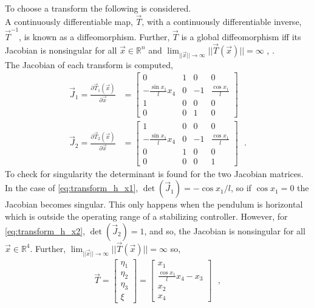 %
To choose a transform the following is considered.\\
A continuously differentiable map, $\vec{T}$, with a continuously differentiable inverse, $\vec{T}^{-1}$, is known as a diffeomorphism. Further, $\vec{T}$ is a global diffeomorphism iff its Jacobian is nonsingular for all $\vec{x} \in \mathbb{R}^n$ and $\lim_{||\vec{x}||\rightarrow \infty}||\vec{T}(\vec{x})|| = \infty$ , \cite{HKKhalil}.\\
The Jacobian of each transform is computed,
\begin{align}
\vec{J}_1 = \frac{\partial \vec{T}_1(\vec{x})}{\partial \vec{x}}
&=
\begin{bmatrix}
  0                       & 1 &  0 & 0                  \\
  -\frac{\sin x_1}{l} x_4 & 0 & -1 & \frac{\cos x_1}{l} \\
  1                       & 0 &  0 & 0                  \\
  0                       & 0 &  1 & 0
\end{bmatrix}  \label{eq:transform_h_x1} \\
\vec{J}_2 = \frac{\partial \vec{T}_2(\vec{x})}{\partial \vec{x}}
&=
\begin{bmatrix}
  1                       & 0 &  0 & 0                  \\
  -\frac{\sin x_1}{l} x_4 & 0 & -1 & \frac{\cos x_1}{l} \\
  0                       & 1 &  0 & 0                  \\
  0                       & 0 &  0 & 1
\end{bmatrix} \ \ \ . \label{eq:transform_h_x2}
\end{align}
To check for singularity the determinant is found for the two Jacobian matrices. In the case of \autoref{eq:transform_h_x1}, $\det(\vec{J}_1) = -\cos x_1/l$, so if $\cos x_1 = 0$ the Jacobian becomes singular. This only happens when the pendulum is horizontal which is outside the operating range of a stabilizing controller. However, for \autoref{eq:transform_h_x2}, $\det(\vec{J}_2) = 1$, and so, the Jacobian is nonsingular for all $\vec{x} \in \mathbb{R}^4$. Further, $\lim_{||\vec{x}||\rightarrow \infty}||\vec{T}(\vec{x})|| = \infty$ so,
\begin{align}
  \vec{T}
  = 
  \begin{bmatrix}
  \eta_1   \\
  \eta_2   \\
  \eta_3   \\
  \xi
  \end{bmatrix}
  =
  \begin{bmatrix}
  x_1   \\
  \frac{\cos x_1}{l} x_4 - x_3  \\
  x_2   \\
  x_4
  \end{bmatrix} \ \ \ , \label{eq:transform}
\end{align}
